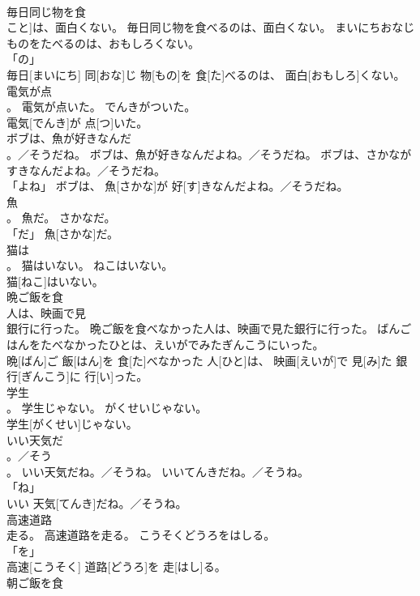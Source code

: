 \documentclass[8pt]{extreport}
\begin{document}
\begin{CJK}{UTF8}{min}
\\	毎日同じ物を食
\\	こと]は、面白くない。	毎日同じ物を食べるのは、面白くない。	まいにちおなじものをたべるのは、おもしろくない。	
\\	「の」 
\\	毎日[まいにち] 同[おな]じ 物[もの]を 食[た]べるのは、 面白[おもしろ]くない。		
\\	電気が点
\\	。	電気が点いた。	でんきがついた。	
\\	電気[でんき]が 点[つ]いた。		
\\	ボブは、魚が好きなんだ
\\	。／そうだね。	ボブは、魚が好きなんだよね。／そうだね。	ボブは、さかながすきなんだよね。／そうだね。	
\\	「よね」	ボブは、 魚[さかな]が 好[す]きなんだよね。／そうだね。		
\\	魚
\\	。	魚だ。	さかなだ。	
\\	「だ」	魚[さかな]だ。		
\\	猫は
\\	。	猫はいない。	ねこはいない。	
\\	猫[ねこ]はいない。		
\\	晩ご飯を食
\\	人は、映画で見
\\	銀行に行った。	晩ご飯を食べなかった人は、映画で見た銀行に行った。	ばんごはんをたべなかったひとは、えいがでみたぎんこうにいった。	
\\	晩[ばん]ご 飯[はん]を 食[た]べなかった 人[ひと]は、 映画[えいが]で 見[み]た 銀行[ぎんこう]に 行[い]った。		
\\	学生
\\	。	学生じゃない。	がくせいじゃない。	
\\	学生[がくせい]じゃない。		
\\	いい天気だ
\\	。／そう
\\	。	いい天気だね。／そうね。	いいてんきだね。／そうね。	
\\	「ね」 
\\	いい 天気[てんき]だね。／そうね。		
\\	高速道路
\\	走る。	高速道路を走る。	こうそくどうろをはしる。	
\\	「を」 
\\	高速[こうそく] 道路[どうろ]を 走[はし]る。		
\\	朝ご飯を食

\end{CJK}
\end{document}
